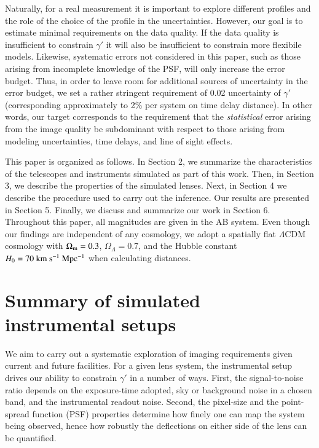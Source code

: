 \documentclass[a4paper,11pt]{article}
\begin{document}
Naturally, for a real measurement it is important to explore different
profiles and the role of the choice of the profile in the
uncertainties. However, our goal is to estimate minimal requirements
on the data quality. If the data quality is insufficient to constrain
$\gamma'$ it will also be insufficient to constrain more flexibile
models. Likewise, systematic errors not considered in this paper, such
as those arising from incomplete knowledge of the PSF, will only
increase the error budget. Thus, in order to leave room for additional
sources of uncertainty in the error budget, we set a rather stringent
requirement of 0.02 uncertainty of $\gamma'$ (corresponding
approximately to 2\% per system on time delay distance). In other
words, our target corresponds to the requirement that the {\it
statistical} error arising from the image quality be subdominant with
respect to those arising from modeling uncertainties, time delays, and
line of sight effects.

This paper is organized as follows. In Section 2, we summarize the
characteristics of the telescopes and instruments simulated as part of
this work. Then, in Section 3, we describe the properties of the
simulated lenses. Next, in Section 4 we describe the procedure used to
carry out the inference.  Our results are presented in Section
5. Finally, we discuss and summarize our work in Section 6. Throughout
this paper, all magnitudes are given in the AB system. Even though our
findings are independent of any cosmology, we adopt a spatially flat
$\Lambda$CDM cosmology with $\Omega_{\rm{m}} = 0.3$, $\Omega_{\Lambda}
= 0.7$, and the Hubble constant $H_{0} = 70~\rm km~s^{-1}~Mpc^{-1}$
when calculating distances.

\section{Summary of simulated instrumental setups}

We aim to carry out a systematic exploration of imaging requirements
given current and future facilities. For a given lens system, the
instrumental setup drives our ability to constrain $\gamma'$ in a
number of ways. First, the signal-to-noise ratio depends on the
exposure-time adopted, sky or background noise in a chosen band, and
the instrumental readout noise. Second, the pixel-size and the
point-spread function (PSF) properties determine how finely one can
map the system being observed, hence how robustly the deflections on
either side of the lens can be quantified.
 
\end{document}
